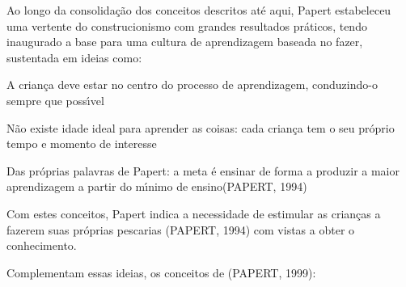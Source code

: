 \documentclass[
12pt,		%
openright,	%
twoside,  %
a4paper,			%
chapter=TITLE,		%
english,			%
french,				%
spanish,			%
brazil				%
]{USPSC-classe/USPSC}
\begin{document}
\noindent\begin{center}\mbox{\centering{}}\end{center}


Ao longo da consolida\c{c}\~ao dos conceitos descritos at\'e aqui, Papert estabeleceu uma vertente do construcionismo com grandes resultados pr\'aticos, tendo inaugurado a base para uma cultura de aprendizagem baseada no \textquotedbl fazer\textquotedbl , sustentada em ideias como:





\begin{alineas}
\item A crian\c{c}a deve estar no centro do processo de aprendizagem, conduzindo-o sempre que poss\'{\i}vel
\item N\~ao existe idade ideal para aprender as coisas: cada crian\c{c}a tem o seu pr\'oprio tempo e momento de interesse
\item Das pr\'oprias palavras de Papert: \textquotedbl a meta \'e ensinar de forma a produzir a maior aprendizagem a partir do m\'{\i}nimo de ensino\textquotedbl   (PAPERT, 1994)
\end{alineas}

Com estes conceitos, Papert indica a necessidade de estimular as crian\c{c}as a fazerem suas pr\'oprias pescarias  (PAPERT, 1994) com vistas a obter o conhecimento.




Complementam essas ideias, os conceitos de  (PAPERT, 1999):
\end{document}

